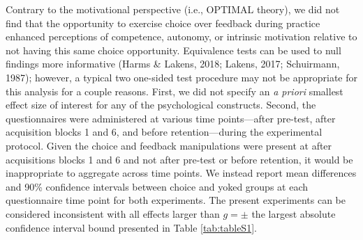 \documentclass[
  doc, donotrepeattitle,floatsintext]{apa7}
\begin{document}
Contrary to the motivational perspective (i.e., OPTIMAL theory), we did not find that the opportunity to exercise choice over feedback during practice enhanced perceptions of competence, autonomy, or intrinsic motivation relative to not having this same choice opportunity. Equivalence tests can be used to null findings more informative (Harms \& Lakens, 2018; Lakens, 2017; Schuirmann, 1987); however, a typical two one-sided test procedure may not be appropriate for this analysis for a couple reasons. First, we did not specify an \emph{a priori} smallest effect size of interest for any of the psychological constructs. Second, the questionnaires were administered at various time points---after pre-test, after acquisition blocks 1 and 6, and before retention---during the experimental protocol. Given the choice and feedback manipulations were present at after acquisitions blocks 1 and 6 and not after pre-test or before retention, it would be inappropriate to aggregate across time points. We instead report mean differences and 90\% confidence intervals between choice and yoked groups at each questionnaire time point for both experiments. The present experiments can be considered inconsistent with all effects larger than \(g = \pm\) the largest absolute confidence interval bound presented in Table \ref{tab:tableS1}.

\vspace{1em}
\end{document}

